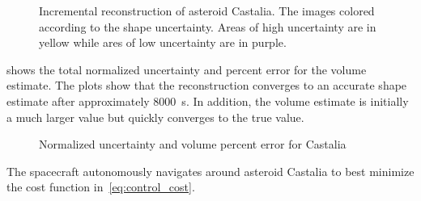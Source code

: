 \documentclass[letterpaper, paper,11pt]{AAS}		%
\begin{document}
\begin{figure}[htbp]
    \caption[Asteroid Castalia shape reconstruction with uncertainty]{Incremental reconstruction of asteroid Castalia. The images colored according to the shape uncertainty. Areas of high uncertainty are in yellow while ares of low uncertainty are in purple.~\label{fig:castalia_weights_reconstruction}}
\end{figure}

 shows the total normalized uncertainty and percent error for the volume estimate. 
The plots show that the reconstruction converges to an accurate shape estimate after approximately \SI{8000}{\second}.
In addition, the volume estimate is initially a much larger value but quickly converges to the true value.
\begin{figure}[htbp]
    \centering
    
    \caption{Normalized uncertainty and volume percent error for Castalia\label{fig:castalia_metrics}}
\end{figure}
The spacecraft autonomously navigates around asteroid Castalia to best minimize the cost function in~\cref{eq:control_cost}.
\end{document}
